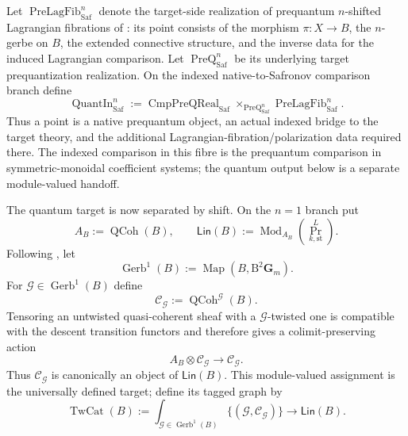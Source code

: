 \begin{construction}
\label{constr:prequantum-safronov-quantization-handoff}
Let $\operatorname{PreLagFib}^{n}_{\mathrm{Saf}}$ denote the target-side
realization of prequantum $n$-shifted Lagrangian fibrations of
\cite[Definition~2.13]{Safronov2020}: its point consists of the morphism
$\pi:X\to B$, the $n$-gerbe on $B$, the extended connective structure, and the
inverse data for the induced Lagrangian comparison.  Let
$\operatorname{PreQ}^{n}_{\mathrm{Saf}}$ be its underlying target
prequantization realization.  On the indexed native-to-Safronov comparison
branch define
\[
\boxed{
\operatorname{QuantIn}_{\mathrm{Saf}}^{n}
:=
\operatorname{CmpPreQReal}_{\mathrm{Saf}}
\times_{\operatorname{PreQ}^{n}_{\mathrm{Saf}}}
\operatorname{PreLagFib}^{n}_{\mathrm{Saf}}.
}
\]
Thus a point is a native prequantum object, an actual indexed bridge to the
target theory, and the additional Lagrangian-fibration/polarization data required
there.  The indexed comparison in this fibre is the prequantum comparison in
symmetric-monoidal coefficient systems; the quantum output below is a separate
module-valued handoff.

The quantum target is now separated by shift.  On the $n=1$ branch put
\[
A_B:=\operatorname{QCoh}(B),
\qquad
\mathsf{Lin}(B)
:=
\operatorname{Mod}_{A_B}
(\operatorname{Pr}^{L}_{k,\mathrm{st}}).
\]
Following \cite[Definition~2.3]{Safronov2020}, let
\[
\operatorname{Gerb}^{1}(B)
:=
\operatorname{Map}(B,\mathrm B^{2}\mathbf G_m).
\]
For $\mathcal G\in\operatorname{Gerb}^{1}(B)$ define
\[
\mathcal C_{\mathcal G}
:=
\operatorname{QCoh}^{\mathcal G}(B).
\]
Tensoring an untwisted quasi-coherent sheaf with a $\mathcal G$-twisted one is
compatible with the descent transition functors and therefore gives a
colimit-preserving action
\[
A_B\otimes\mathcal C_{\mathcal G}
\longrightarrow
\mathcal C_{\mathcal G}.
\]
Thus $\mathcal C_{\mathcal G}$ is canonically an object of $\mathsf{Lin}(B)$.
This module-valued assignment is the universally defined target; define its
tagged graph by
\[
\boxed{
\operatorname{TwCat}(B)
:=
\int_{\mathcal G\in\operatorname{Gerb}^{1}(B)}
\{(\mathcal G,\mathcal C_{\mathcal G})\}
\longrightarrow\mathsf{Lin}(B).
}
\]


\end{construction}
